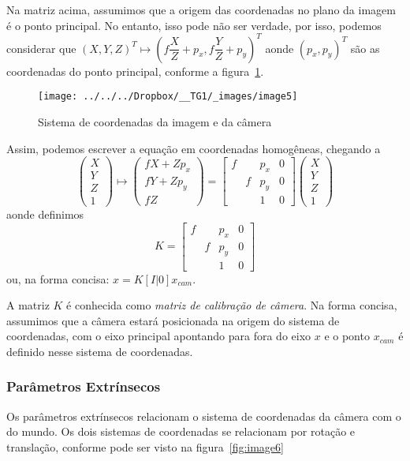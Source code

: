 \documentclass[ecp,tc]{iiufrgs}
\begin{document}
Na matriz acima, assumimos que a origem das coordenadas no plano da imagem é o ponto principal. No entanto, isso pode não ser verdade, por isso, podemos considerar que $ (X, Y, Z)^T \mapsto (f\dfrac{X}{Z} + p_x, f\dfrac{Y}{Z} + p_y)^T $ aonde $ (p_x, p_y)^T $ são as coordenadas do ponto principal, conforme a figura~\ref{fig:image5}.

\begin{figure}
	\centering
	\caption{Sistema de coordenadas da imagem e da câmera}
	\texttt{[image: ../../../Dropbox/\_\_TG1/\_images/image5]}
	\label{fig:image5}
\end{figure}

Assim, podemos escrever a equação em coordenadas homogêneas, chegando a
\[\begin{pmatrix} X \\ Y \\ Z \\ 1 \end{pmatrix} \mapsto \begin{pmatrix} fX+Zp_x \\ fY+Zp_y \\ fZ \end{pmatrix} = \begin{bmatrix} f &  & p_x & 0 \\ & f & p_y & 0 \\ & & 1 & 0 \end{bmatrix} \begin{pmatrix} X \\ Y \\ Z \\ 1 \end{pmatrix} \]
aonde definimos
\[K = \begin{bmatrix} f &  & p_x & 0 \\ & f & p_y & 0 \\ & & 1 & 0 \end{bmatrix}\]
ou, na forma concisa: $ x = K[I|0]x_{cam}$.

A matriz $ K $ é conhecida como \textit{matriz de calibração de câmera}. Na forma concisa, assumimos que a câmera estará posicionada na origem do sistema de coordenadas, com o eixo principal apontando para fora do eixo $ x $ e o ponto $ x_{cam} $ é definido nesse sistema de coordenadas.

\subsubsection{Parâmetros Extrínsecos}
\label{sec:extrinsic}
Os parâmetros extrínsecos relacionam o sistema de coordenadas da câmera com o do mundo. Os dois sistemas de coordenadas se relacionam por rotação e translação, conforme pode ser visto na figura~\ref{fig:image6}
\end{document}
